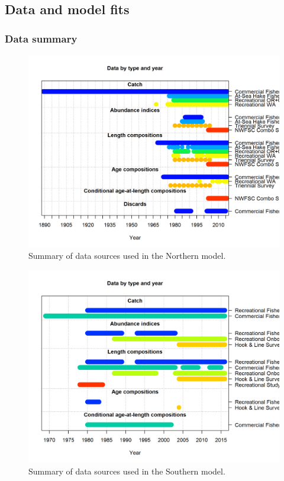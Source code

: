 \documentclass[12pt,]{article}
\begin{document}
\subsection{Data and model fits}\label{data-and-model-fits}

\subsubsection{Data summary}\label{data-summary}

\begin{figure}[htbp]
\centering
\includegraphics{r4ss/plots_mod1/data_plot.png}
\caption{Summary of data sources used in the Northern model.
\label{fig:data_plot}}
\end{figure}

\begin{figure}[htbp]
\centering
\includegraphics{r4ss/plots_mod2/data_plot.png}
\caption{Summary of data sources used in the Southern model.
\label{fig:data_plot}}
\end{figure}
\end{document}
